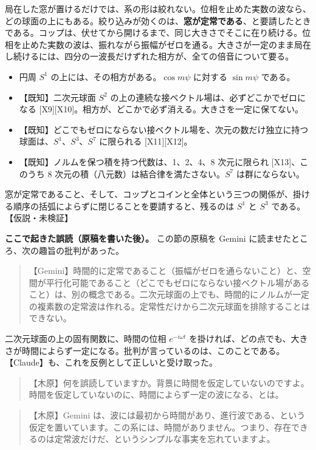 \documentclass[
  a4paper,
]{ltjsarticle}
\providecommand{\tightlist}{%
  \setlength{\itemsep}{0pt}\setlength{\parskip}{0pt}}
\begin{document}
局在した窓が置けるだけでは、系の形は絞れない。位相を止めた実数の波なら、どの球面の上にもある。絞り込みが効くのは、\textbf{窓が定常である}、と要請したときである。コップは、伏せてから開けるまで、同じ大きさでそこに在り続ける。位相を止めた実数の波は、振れながら振幅がゼロを通る。大きさが一定のまま局在し続けるには、四分の一波長だけずれた相方が、全ての倍音について要る。

\begin{itemize}
\tightlist
\item
  円周 \(S^1\) の上には、その相方がある。\(\cos m\psi\) に対する
  \(\sin m\psi\) である。
\item
  【既知】二次元球面 \(S^2\)
  の上の連続な接ベクトル場は、必ずどこかでゼロになる
  {[}X9{]}{[}X10{]}。相方が、どこかで必ず消える。大きさを一定に保てない。
\item
  【既知】どこでもゼロにならない接ベクトル場を、次元の数だけ独立に持つ球面は、\(S^1\)、\(S^3\)、\(S^7\)
  に限られる {[}X11{]}{[}X12{]}。
\item
  【既知】ノルムを保つ積を持つ代数は、1、2、4、8 次元に限られ
  {[}X13{]}、このうち 8 次元の積（八元数）は結合律を満たさない。\(S^7\)
  は群にならない。
\end{itemize}

窓が定常であること、そして、コップとコインと全体という三つの関係が、掛ける順序の括弧によらずに閉じることを要請すると、残るのは
\(S^1\) と \(S^3\) である。【仮説・未検証】

\textbf{ここで起きた誤読（原稿を書いた後）。} この節の原稿を Gemini
に読ませたところ、次の趣旨の批判があった。

\begin{quote}
【Gemini】時間的に定常であること（振幅がゼロを通らないこと）と、空間が平行化可能であること（どこでもゼロにならない接ベクトル場があること）は、別の概念である。二次元球面の上でも、時間的にノルムが一定の複素数の定常波は作れる。定常性だけから二次元球面を排除することはできない。
\end{quote}

二次元球面の上の固有関数に、時間の位相 \(e^{-i\omega t}\)
を掛ければ、どの点でも、大きさが時間によらず一定になる。批判が言っているのは、このことである。【Claude】も、これを反例として正しいと受け取った。

\begin{quote}
【木原】何を誤読していますか。背景に時間を仮定していないのですよ。時間を仮定していないのに、時間によらず一定の波になる、とは。
\end{quote}

\begin{quote}
【木原】Gemini
は、波には最初から時間があり、進行波である、という仮定を置いています。この系には、時間がありません。つまり、存在できるのは定常波だけだ、というシンプルな事実を忘れていますよ。
\end{quote}
\end{document}
